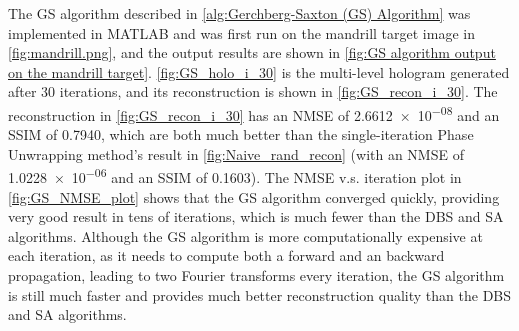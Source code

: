 The GS algorithm described in \cref{alg:Gerchberg-Saxton (GS) Algorithm} was implemented in MATLAB and was first run on the mandrill target image in \cref{fig:mandrill.png}, and the output results are shown in \cref{fig:GS algorithm output on the mandrill target}. \cref{fig:GS_holo_i_30} is the multi-level hologram generated after 30 iterations, and its reconstruction is shown in \cref{fig:GS_recon_i_30}. The reconstruction in \cref{fig:GS_recon_i_30} has an NMSE of \num{2.6612e-08} and an SSIM of 0.7940, which are both much better than the single-iteration Phase Unwrapping method's result in \cref{fig:Naive_rand_recon} (with an NMSE of \num{1.0228e-06} and an SSIM of 0.1603). The NMSE v.s. iteration plot in \cref{fig:GS_NMSE_plot} shows that the GS algorithm converged quickly, providing very good result in tens of iterations, which is much fewer than the DBS and SA algorithms. Although the GS algorithm is more computationally expensive at each iteration, as it needs to compute both a forward and an backward propagation, leading to two Fourier transforms every iteration, the GS algorithm is still much faster and provides much better reconstruction quality than the DBS and SA algorithms.

